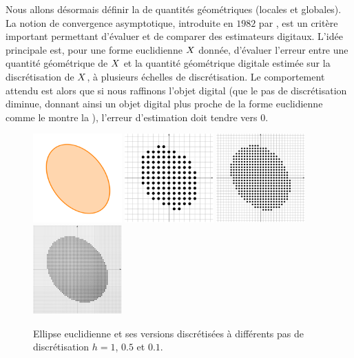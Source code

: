 Nous allons désormais définir la  de quantités géométriques (locales et globales). La notion de
convergence asymptotique, introduite en $1982$ par ,
est un critère important permettant d'évaluer et de comparer des estimateurs
digitaux. L'idée principale est, pour une forme euclidienne $X$ donnée,
d'évaluer l'erreur entre une quantité géométrique de $X$ et la quantité
géométrique digitale estimée sur la discrétisation de $X$, à plusieurs
échelles de discrétisation. Le comportement attendu est alors que si nous
raffinons l'objet digital (\cad que le pas de discrétisation diminue, donnant
ainsi un objet digital plus proche de la forme euclidienne comme le montre la
), l'erreur d'estimation doit tendre vers $0$.


\begin{figure}[ht]{
    \begin{center}
    \includegraphics[width=3.4cm]{images/Notions/multi-ellipse-0}
    \includegraphics[width=3.4cm]{images/Notions/multi-ellipse-1}
    \includegraphics[width=3.4cm]{images/Notions/multi-ellipse-2}
    \includegraphics[width=3.4cm]{images/Notions/multi-ellipse-4}
    \end{center}}
    \caption{Ellipse euclidienne et ses versions discrétisées à différents pas de discrétisation $h = 1$, $0.5$ et $0.1$.\label{fig:digital-ellipse}}
\end{figure}


